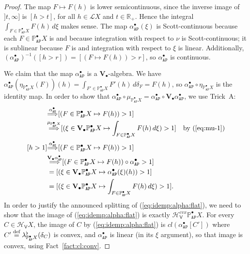 \documentclass[preprint,12pt]{elsarticle}
\newcommand\eqdef{\mathrel{\buildrel \text{def}\over=}}
\newcommand{\Rp}{\mathbb{R}_+}
\newcommand\Lform{\mathcal L}
\newcommand\Pred{\mathbb{P}}
\newcommand\Angel{{\mathtt{A}}}
\newcommand\Nature{{\mathtt{P}}}
\newcommand\AN{{\Angel\Nature}}
\newcommand\invto[1]{{\buildrel {#1} \over\Longrightarrow}}
\newcommand\Hoare{{\mathcal H}}
\newcommand\Vt{\mathsf{V}}
\newcommand\HV{\Hoare_\Vt}
\newcommand\Val{{\mathbf V}}
\begin{document}
\begin{proof}
  The map $F \mapsto F (h)$ is lower semicontinuous, since the inverse
  image of $]t, \infty]$ is $[h > t]$, for all $h \in \Lform X$ and
  $t \in \Rp$.  Hence the integral
  $\int_{F \in \Pred_\AN^\bullet X} F (h) \,d\xi$ makes sense.  The
  map ${\alpha_\AN^\bullet} (\xi)$ is Scott-continuous because each
  $F \in \Pred_\AN^\bullet X$ is and because integration with respect
  to $\nu$ is Scott-continuous; it is sublinear because $F$ is and
  integration with respect to $\xi$ is linear.  Additionally,
  ${(\alpha_\AN^\bullet)}^{-1} ([h > r]) = [(F \mapsto F (h)) > r]$,
  so ${\alpha_\AN^\bullet}$ is continuous.

  We claim that the map $\alpha_\AN^\bullet$ is a
  $\Val_\bullet$-algebra.  We have
  $\alpha_\AN^\bullet (\eta_{\Pred_\AN^\bullet X} (F)) (h) = \int_{F'
    \in \Pred_\AN^\bullet X} F' (h)\,d\delta_F = F (h)$, so
  $\alpha_\AN^\bullet \circ \eta_{\Pred_\AN^\bullet X}$ is the
  identity map.  In order to show that
  $\alpha_\AN^\bullet \circ \mu_{\Pred_\AN^\bullet X} =
  \alpha_\AN^\bullet \circ \Val_\bullet {\alpha_\AN^\bullet}$, we use
  Trick~A:
  \begin{align*}
    [h > 1]
    & \invto{\alpha_\AN^\bullet}
      [(F \in \Pred_\AN^\bullet X \mapsto F (h)) > 1] \\
    & \invto{\mu_{\Pred_\AN^\bullet X}}
      [(\xi \in \Val_\bullet {\Pred_\AN^\bullet X} \mapsto
      \int_{F \in \Pred_\AN^\bullet X} F (h) \,d\xi) > 1]
    & \text{by (\ref{eq:mu-1})} \\
    [h > 1]
    & \invto{\alpha_\AN^\bullet}
      [(F \in \Pred_\AN^\bullet X \mapsto F (h)) > 1] \\
    & \invto{\Val_\bullet {\alpha_\AN^\bullet}}
      [(F \in \Pred_\AN^\bullet X \mapsto F (h)) \circ
      \alpha_\AN^\bullet > 1] \\
    & = [(\xi \in \Val_\bullet {\Pred_\AN^\bullet X} \mapsto
      \alpha_\AN^\bullet (\xi) (h)) > 1] \\
    & = [(\xi \in \Val_\bullet {\Pred_\AN^\bullet X} \mapsto
      \int_{F \in \Pred_\AN^\bullet X} F (h) \,d\xi) > 1].
  \end{align*}
  In order to justify the announced splitting of
  (\ref{eq:idemp:alpha:flat}), we need to show that the image of
  (\ref{eq:idemp:alpha:flat}) is exactly $\HV^{cvx} {\Pred_\AN^\bullet X}$.
  For every $C \in \HV X$, the image of $C$ by (\ref{eq:idemp:alpha:flat})
  is $cl (\alpha_\AN^\bullet [C'])$ where
  $C' \eqdef \lambda^\flat_{\Pred_\AN^\bullet X} (\delta_C)$ is
  convex, and $\alpha_\AN^\bullet$ is linear (in its $\xi$ argument),
  so that image is convex, using Fact~\ref{fact:cl:conv}.


\end{proof}
\end{document}

